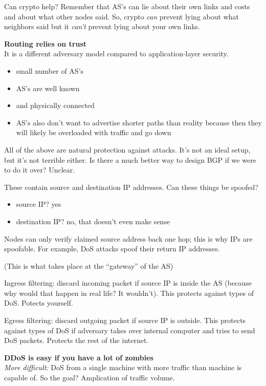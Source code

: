 Can crypto help? Remember that AS's can lie about their own links and costs and about
what other nodes said. So, crypto \textit{can} prevent lying about what neighbors said but it \textit{can't} prevent lying about your own links.

\textbf{Routing relies on trust}\\
It is a different adversary model compared to application-layer security. 
\begin{itemize}
	\item small number of AS's
	\item AS's are well known
	\item and physically connected
	\item AS's also don't want to advertise shorter paths than reality because then
		they will likely be overloaded with traffic and go down
\end{itemize}
All of the above are natural protection against attacks. It's not an ideal setup, but it's not terrible either. Is there a much better way to design BGP if we were to do it over? Unclear.

These contain source and destination IP addresses. Can these things be spoofed? 
\begin{itemize}
	\item source IP? yes
	\item destination IP? no, that doesn't even make sense
\end{itemize}

Nodes can only verify claimed source address back one hop; this is why IPs are spoofable. For example, DoS attacks spoof their return IP addresses.

(This is what takes place at the ``gateway'' of the AS)

Ingress filtering: discard incoming packet if source IP is inside the AS (because why would that happen in real life? It wouldn't). This protects against types of DoS. Potects yourself.

Egress filtering: discard outgoing packet if source IP is outside. This protects against types of DoS if adversary takes over internal computer and tries to send DoS packets. Protects the rest of the internet.

\textbf{DDoS is easy if you have a lot of zombies}\\
\textit{More difficult:} DoS from a single machine with more traffic than machine is capable of. So the goal? Amplication of traffic volume.

